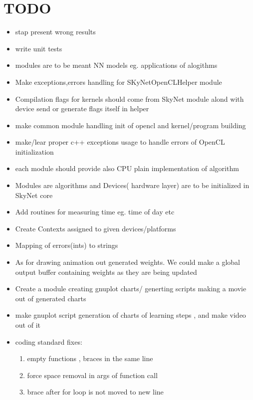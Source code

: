 \documentclass[a4paper,10pt]{article}
\begin{document}
\section{TODO}
\begin{itemize}
\item stap present wrong results
\item write unit tests
\item modules are to be meant NN models eg. applications of alogithms
\item Make exceptions,errors handling for SKyNetOpenCLHelper module
\item Compilation flags for kernels should come from SkyNet module alond with device send or generate flags itself in helper
\item make common module handling init of opencl and kernel/program building
\item make/lear proper c++ exceptions usage to handle errors of OpenCL initialization
\item each module should provide also CPU plain implementation of algorithm
\item Modules are algorithms and Devices( hardware layer) are to be initialized in SkyNet core
\item Add routines for measuring time eg. time of day etc
\item Create Contexts assigned to given devices/platforms
\item Mapping of errors(ints) to strings
\item As for drawing animation out generated weights. We could make a global output buffer
containing weights as they are being updated
\item Create a module creating gnuplot charts/ generting scripts making a movie out of generated charts
\item make gnuplot script generation of charts of learning steps , and make video out of it
\item coding standard fixes:
\begin{enumerate}
\item empty functions , braces in the same line
\item force space removal in args of function call
\item brace after for loop is not moved to new line
\end{enumerate}
\end{itemize}
\end{document}
